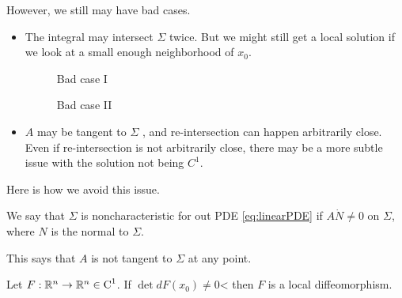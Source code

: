 However, we still may have bad cases. 
\begin{itemize}
    \item The integral may intersect $\Sigma$ twice. But we might still get a local solution if we look at a small enough neighborhood of $x_0$.
    \begin{figure}[H]
    \begin{minipage}{0.5 \textwidth}
        \centering
        \caption{Bad case I}
\end{minipage}
\begin{minipage}{0.5 \textwidth}
    \centering
    \caption{Bad case II}
\end{minipage}
\end{figure}
    \item $A$ may be tangent to $\Sigma$ , and re-intersection can happen arbitrarily close. Even if re-intersection is not arbitrarily close, there may be a more subtle issue with the solution not being $C^1$.
\end{itemize}

Here is how we avoid this issue.

\begin{definition}
    We say that $\Sigma $ is noncharacteristic for out PDE \eqref{eq:linearPDE} if $A\dot N \neq 0$ on $\Sigma$, where $N$ is the normal to $\Sigma$.
\end{definition}
This says that $A$ is not tangent to $\Sigma$ at any point.

\begin{theorem}
    Let $F:\mathbb{R}^n \to \mathbb{R}^n \in \operatorname{C}^1$. If $\det dF(x_0)\neq 0$< then $F$ is a local diffeomorphism.
\end{theorem}

